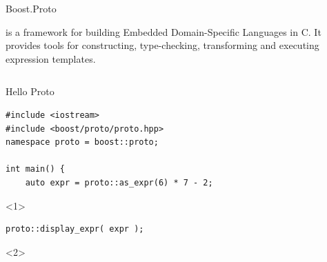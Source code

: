 \documentclass[@BEAMER_OPTIONS@]{beamer}
\newcommand{\CXX}{{\rm C}\plusplus}
\begin{document}
\begin{frame}[fragile]{Boost.Proto}
    \begin{description}[\quad]
        \item[Boost.Proto]  is a framework for building Embedded
            Domain-Specific Languages in \CXX. It provides tools for
            constructing, type-checking, transforming and executing expression
            templates.
    \end{description}
    \begin{columns}
        \begin{column}[t]{0.6\textwidth}
            \begin{exampleblock}{Hello Proto}
                \begin{lstlisting}
#include <iostream>
#include <boost/proto/proto.hpp>
namespace proto = boost::proto;

int main() {
    auto expr = proto::as_expr(6) * 7 - 2;
                \end{lstlisting}
                \begin{uncoverenv}<1>
                    \begin{lstlisting}[firstnumber=last]
    proto::display_expr( expr );
                    \end{lstlisting}
                \end{uncoverenv}
                \begin{uncoverenv}<2>
                    \begin{lstlisting}[firstnumber=last]


\end{lstlisting}
\end{uncoverenv}
\end{exampleblock}
\end{column}
\end{columns}
\end{frame}
\end{document}
